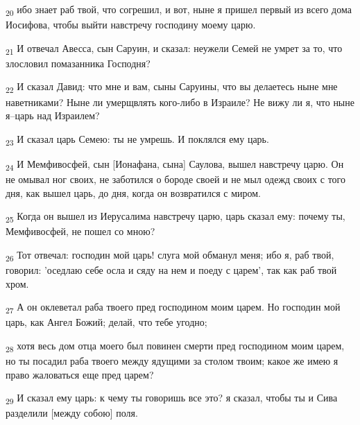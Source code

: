 \begin{tcolorbox}
\textsubscript{20} ибо знает раб твой, что согрешил, и вот, ныне я пришел первый из всего дома Иосифова, чтобы выйти навстречу господину моему царю.
\end{tcolorbox}
\begin{tcolorbox}
\textsubscript{21} И отвечал Авесса, сын Саруин, и сказал: неужели Семей не умрет за то, что злословил помазанника Господня?
\end{tcolorbox}
\begin{tcolorbox}
\textsubscript{22} И сказал Давид: что мне и вам, сыны Саруины, что вы делаетесь ныне мне наветниками? Ныне ли умерщвлять кого-либо в Израиле? Не вижу ли я, что ныне я--царь над Израилем?
\end{tcolorbox}
\begin{tcolorbox}
\textsubscript{23} И сказал царь Семею: ты не умрешь. И поклялся ему царь.
\end{tcolorbox}
\begin{tcolorbox}
\textsubscript{24} И Мемфивосфей, сын [Ионафана, сына] Саулова, вышел навстречу царю. Он не омывал ног своих, не заботился о бороде своей и не мыл одежд своих с того дня, как вышел царь, до дня, когда он возвратился с миром.
\end{tcolorbox}
\begin{tcolorbox}
\textsubscript{25} Когда он вышел из Иерусалима навстречу царю, царь сказал ему: почему ты, Мемфивосфей, не пошел со мною?
\end{tcolorbox}
\begin{tcolorbox}
\textsubscript{26} Тот отвечал: господин мой царь! слуга мой обманул меня; ибо я, раб твой, говорил: 'оседлаю себе осла и сяду на нем и поеду с царем', так как раб твой хром.
\end{tcolorbox}
\begin{tcolorbox}
\textsubscript{27} А он оклеветал раба твоего пред господином моим царем. Но господин мой царь, как Ангел Божий; делай, что тебе угодно;
\end{tcolorbox}
\begin{tcolorbox}
\textsubscript{28} хотя весь дом отца моего был повинен смерти пред господином моим царем, но ты посадил раба твоего между ядущими за столом твоим; какое же имею я право жаловаться еще пред царем?
\end{tcolorbox}
\begin{tcolorbox}
\textsubscript{29} И сказал ему царь: к чему ты говоришь все это? я сказал, чтобы ты и Сива разделили [между собою] поля.
\end{tcolorbox}
